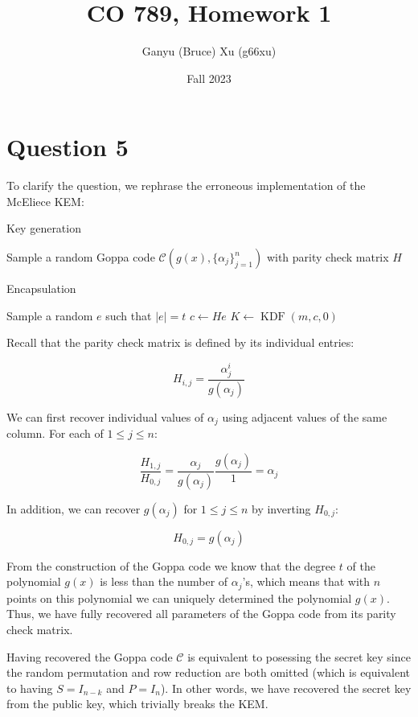 \documentclass{article}
\title{CO 789, Homework 1}
\author{Ganyu (Bruce) Xu (g66xu)}
\date{Fall 2023}
\newcommand{\norm}[1]{\vert {#1} \vert}
\begin{document}

\section*{Question 5}
To clarify the question, we rephrase the erroneous implementation of the McEliece KEM:

\begin{algorithm}
    \caption{Key generation}
    Sample a random Goppa code $\mathcal{C}(g(x), \{\alpha_j\}_{j=1}^n)$ with parity check matrix $H$\;
\end{algorithm}

\begin{algorithm}
    \caption{Encapsulation}
    Sample a random $e$ such that $\norm{e} = t$\;
    $c \leftarrow He$\;
    $K \leftarrow \operatorname{KDF}(m, c, 0)$
    \;
\end{algorithm}

Recall that the parity check matrix is defined by its individual entries:

\begin{equation*}
    H_{i,j} = \frac{\alpha_j^i}{g(\alpha_j)}
\end{equation*}

We can first recover individual values of $\alpha_j$ using adjacent values of the same column. For each of $1 \leq j \leq n$:

\begin{equation*}
    \frac{H_{1,j}}{H_{0,j}} 
    = \frac{\alpha_j}{g(\alpha_j)} \frac{g(\alpha_j)}{1}
    = \alpha_j
\end{equation*}

In addition, we can recover $g(\alpha_j)$ for $1 \leq j \leq n$ by inverting $H_{0,j}$:

\begin{equation*}
    H_{0,j} = g(\alpha_j)
\end{equation*}

From the construction of the Goppa code we know that the degree $t$ of the polynomial $g(x)$ is less than the number of $\alpha_j$'s, which means that with $n$ points on this polynomial we can uniquely determined the polynomial $g(x)$. Thus, we have fully recovered all parameters of the Goppa code from its parity check matrix.

Having recovered the Goppa code $\mathcal{C}$ is equivalent to posessing the secret key since the random permutation and row reduction are both omitted (which is equivalent to having $S = I_{n-k}$ and $P = I_n$). In other words, we have recovered the secret key from the public key, which trivially breaks the KEM.
\end{document}
